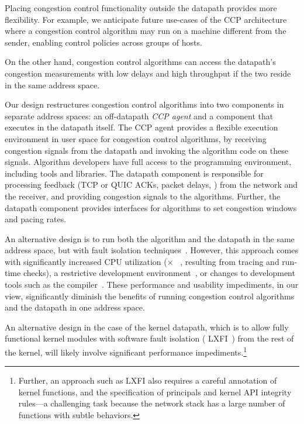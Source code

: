  Placing congestion control functionality outside the datapath provides more flexibility. For example, we anticipate future use-cases of the CCP architecture where
a congestion control algorithm may run on a machine different from the sender,
enabling control policies across groups of hosts.

 On the other hand, congestion control algorithms can access the datapath's
congestion measurements with low delays and high throughput if the two reside in
the same address space.

Our design restructures congestion control algorithms into two components in
separate address spaces: an off-datapath {\em CCP agent} and a component that
executes in the datapath itself.
%
The CCP agent provides a flexible execution environment in user space for congestion control algorithms, by receiving congestion signals from the datapath
and invoking the algorithm code on these signals.
%
Algorithm developers have full access to the \userspace programming environment, including tools and libraries.
%
The datapath component is responsible for processing feedback (\eg TCP or QUIC
ACKs, packet delays, \etc) from the network and the receiver, and providing congestion signals to the algorithms.
%
Further, the datapath component provides interfaces for algorithms to set
congestion windows and pacing rates.

An alternative design is to run both the algorithm and the datapath in the same address space, but with fault isolation techniques~\cite{sfi, xfi, bgi, lxfi, nacl, janus, systrace}. 
%
However, this approach comes with significantly increased CPU utilization ($\times$ ~\cite{lxfi, sfi, bgi, janus, systrace}, resulting from tracing and run-time checks), a restrictive development environment~\cite{nacl}, or changes to development tools such as the compiler~\cite{xfi, sfi}.
%
These performance and usability impediments, in our view, significantly diminish the benefits of running congestion control algorithms and the datapath in one address space.

An alternative design in the case of the kernel datapath, which is to allow
fully functional kernel modules with software fault isolation (\eg
LXFI~\cite{lxfi}) from the rest of the kernel, will likely involve significant
performance impediments.\footnote{Further, an approach such as LXFI also
  requires a careful annotation of kernel functions, and the specification of
  principals and kernel API integrity rules---a challenging task because the
  network stack has a large number of functions with subtle behaviors.}
%
\fi

